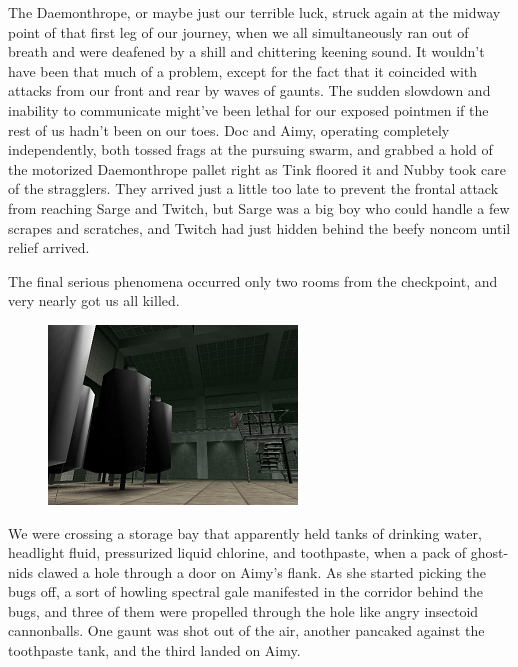 The Daemonthrope, or maybe just our terrible luck, struck again at the midway point of that first leg of our journey, when we all simultaneously ran out of breath and were deafened by a shill and chittering keening sound. 
It wouldn't have been that much of a problem, except for the fact that it coincided with attacks from our front and rear by waves of gaunts. 
The sudden slowdown and inability to communicate might've been lethal for our exposed pointmen if the rest of us hadn't been on our toes. 
Doc and Aimy, operating completely independently, both tossed frags at the pursuing swarm, and grabbed a hold of the motorized Daemonthrope pallet right as Tink floored it and Nubby took care of the stragglers. 
They arrived just a little too late to prevent the frontal attack from reaching Sarge and Twitch, but Sarge was a big boy who could handle a few scrapes and scratches, and Twitch had just hidden behind the beefy noncom until relief arrived.

The final serious phenomena occurred only two rooms from the checkpoint, and very nearly got us all killed.

\begin{figure}
	\begin{center}
		\includegraphics[width=\figwidth]{pics/15/52.png}
	\end{center}
\end{figure}
We were crossing a storage bay that apparently held tanks of drinking water, headlight fluid, pressurized liquid chlorine, and toothpaste, when a pack of ghost-nids clawed a hole through a door on Aimy's flank. 
As she started picking the bugs off, a sort of howling spectral gale manifested in the corridor behind the bugs, and three of them were propelled through the hole like angry insectoid cannonballs. 
One gaunt was shot out of the air, another pancaked against the toothpaste tank, and the third landed on Aimy.

